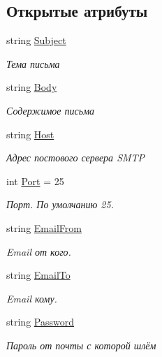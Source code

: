 \subsection*{Открытые атрибуты}
\begin{DoxyCompactItemize}
\item 
string \mbox{\hyperlink{class_f_b_a_1_1_sys_email_a8e115c41139040518c849daa5178ecd0}{Subject}}
\begin{DoxyCompactList}\small\item\em Тема письма \end{DoxyCompactList}\item 
string \mbox{\hyperlink{class_f_b_a_1_1_sys_email_aa325838d1b75ea901f439449f6707df0}{Body}}
\begin{DoxyCompactList}\small\item\em Содержимое письма \end{DoxyCompactList}\item 
string \mbox{\hyperlink{class_f_b_a_1_1_sys_email_ac0c362c82fb69187163633a611af03eb}{Host}}
\begin{DoxyCompactList}\small\item\em Адрес постового сервера S\+M\+TP \end{DoxyCompactList}\item 
int \mbox{\hyperlink{class_f_b_a_1_1_sys_email_a737e4967e6cb0c397b259b12c515d988}{Port}} = 25
\begin{DoxyCompactList}\small\item\em Порт. По умолчанию 25. \end{DoxyCompactList}\item 
string \mbox{\hyperlink{class_f_b_a_1_1_sys_email_ad09bcb462dcdd51123896d6f7ae08a63}{Email\+From}}
\begin{DoxyCompactList}\small\item\em Email от кого. \end{DoxyCompactList}\item 
string \mbox{\hyperlink{class_f_b_a_1_1_sys_email_aed2c49fcdc15ad4fa1d00ccafba59f94}{Email\+To}}
\begin{DoxyCompactList}\small\item\em Email кому. \end{DoxyCompactList}\item 
string \mbox{\hyperlink{class_f_b_a_1_1_sys_email_a207aa6714c78d8ccfc0ec31d9176c0eb}{Password}}
\begin{DoxyCompactList}\small\item\em Пароль от почты с которой шлём \end{DoxyCompactList}\item 

\end{DoxyCompactItemize}
